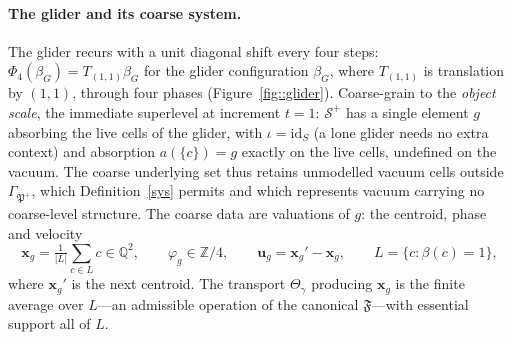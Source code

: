 \documentclass[runningheads]{llncs}
\begin{document}
\paragraph{The glider and its coarse system.} The glider recurs with a unit diagonal shift every four steps: $\Phi_4(\beta_G)=T_{(1,1)}\beta_G$ for the glider configuration $\beta_G$, where $T_{(1,1)}$ is translation by $(1,1)$, through four phases (Figure~\ref{fig::glider}). Coarse-grain to the \emph{object scale}, the immediate superlevel at increment $t=1$: $\mathcal S^{+}$ has a single element $g$ absorbing the live cells of the glider, with $\iota=\mathrm{id}_S$ (a lone glider needs no extra context) and absorption $a(\{c\})=g$ exactly on the live cells, undefined on the vacuum. The coarse underlying set thus retains unmodelled vacuum cells outside $\Gamma_{\mathfrak P^{+}}$, which Definition~\ref{sys} permits and which represents vacuum carrying no coarse-level structure. The coarse data are valuations of $g$: the centroid, phase and velocity
\[
\mathbf x_g=\tfrac{1}{|L|}\textstyle\sum_{c\in L}c\in\mathbb Q^2,\qquad
\varphi_g\in\mathbb Z/4,\qquad
\mathbf u_g=\mathbf x_g'-\mathbf x_g,\qquad L=\{c:\beta(c)=1\},
\]
where $\mathbf x_g'$ is the next centroid. The transport $\Theta_\gamma$ producing $\mathbf x_g$ is the finite average over $L$---an admissible operation of the canonical $\mathfrak F$---with essential support all of $L$.
\end{document}
